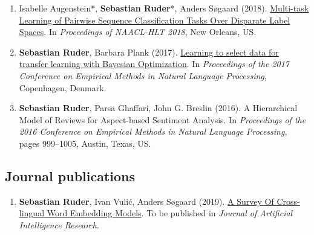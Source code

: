 \documentclass[10pt,letterpaper]{article}
\begin{document}
\begin{enumerate}
	\item Isabelle Augenstein*, \textbf{Sebastian Ruder}*, Anders Søgaard (2018). \href{https://arxiv.org/abs/1802.09913}{Multi-task Learning of Pairwise Sequence Classification Tasks Over Disparate Label Spaces}. In \textit{Proceedings of NAACL-HLT 2018}, New Orleans, US. 
	
	\newenvironment{starfootnotes}
  {\par\edef\savedfootnotenumber{\number\value{footnote}}
   \renewcommand{\thefootnote}{$\star$} 
   \setcounter{footnote}{0}}
  {\par\setcounter{footnote}{\savedfootnotenumber}}
	
\begin{starfootnotes}
\end{starfootnotes}
		
	\item \textbf{Sebastian Ruder}, Barbara Plank (2017). \href{https://arxiv.org/abs/1707.05246}{Learning to select data for transfer learning with Bayesian Optimization}. In \textit{Proceedings of the 2017 Conference on Empirical Methods in Natural Language Processing}, Copenhagen, Denmark.
	
	\item \textbf{Sebastian Ruder}, Parsa Ghaffari, John G. Breslin (2016). A Hierarchical Model of Reviews for Aspect-based Sentiment Analysis. In \textit{Proceedings of the 2016 Conference on Empirical Methods in Natural Language Processing}, pages 999–1005, Austin, Texas, US.
	
	
\end{enumerate}

\vspace{-0.4em}
\subsection*{Journal publications}

\begin{enumerate}
	\parskip=0.1em
	\setcounter{enumi}{11}

	\item \textbf{Sebastian Ruder}, Ivan Vulić, Anders Søgaard (2019). \href{https://arxiv.org/abs/1706.04902}{A Survey Of Cross-lingual Word Embedding Models}. To be published in \textit{Journal of Artificial Intelligence Research}.
	
\end{enumerate}
\end{document}
